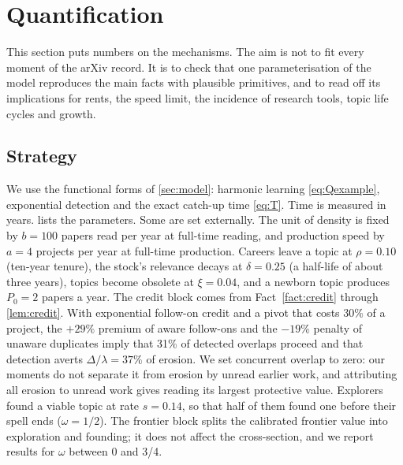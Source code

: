 \section{Quantification}\label{sec:quant}

This section puts numbers on the mechanisms. The aim is not to fit every
moment of the arXiv record. It is to check that one parameterisation of the
model reproduces the main facts with plausible primitives, and to read off its
implications for rents, the speed limit, the incidence of research tools,
topic life cycles and growth.

\subsection{Strategy}

We use the functional forms of \cref{sec:model}: harmonic learning
\eqref{eq:Qexample}, exponential detection and the exact catch-up time
\eqref{eq:T}. Time is measured in years.  lists the
parameters. Some are set externally. The unit of density is fixed by $b=100$
papers read per year at full-time reading, and production speed by $a=4$
projects per year at full-time production. Careers leave a topic at $\rho=0.10$
(ten-year tenure), the stock's relevance decays at $\delta=0.25$ (a half-life of
about three years), topics become obsolete at $\xi=0.04$, and a newborn topic
produces $P_0=2$ papers a year. The credit block comes from
Fact~\ref{fact:credit} through \cref{lem:credit}. With exponential follow-on
credit and a pivot that costs 30\% of a project, the $+29\%$ premium of aware
follow-ons and the $-19\%$ penalty of unaware duplicates imply that 31\% of
detected overlaps proceed and that detection averts $\Delta/\lambda=37\%$ of
erosion. We set concurrent overlap to zero: our moments do not separate it from
erosion by unread earlier work, and attributing all erosion to unread work
gives reading its largest protective value. Explorers found a viable topic at
rate $s=0.14$, so that half of them found one before their spell ends
($\omega=1/2$). The frontier block splits the calibrated frontier value into
exploration and founding; it does not affect the cross-section, and we report
results for $\omega$ between 0 and 3/4.

